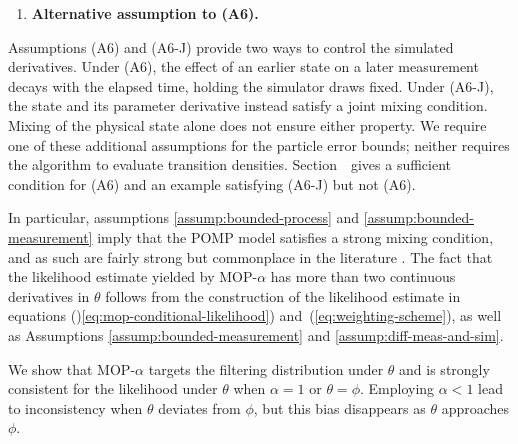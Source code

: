 \documentclass[numsec,webpdf,modern,medium,namedate]{oup-authoring-template}
\begin{document}
\begin{enumerate}[label=(A\arabic*),itemsep=0pt]
\item[(A6-J)]{\textbf{Alternative assumption to (A6).}} 
\end{enumerate}

Assumptions (A6) and (A6-J) provide two ways to control the simulated derivatives.
Under (A6), the effect of an earlier state on a later measurement decays with the elapsed time, holding the simulator draws fixed.
Under (A6-J), the state and its parameter derivative instead satisfy a joint mixing condition.
Mixing of the physical state alone does not ensure either property.
We require one of these additional assumptions for the particle error bounds; neither requires the algorithm to evaluate transition densities.
Section~\suppSecProofSharperBiasVar\ gives a sufficient condition for (A6) and an example satisfying (A6-J) but not (A6).

In particular, assumptions \ref{assump:bounded-process} and \ref{assump:bounded-measurement} imply that the POMP model satisfies a strong mixing condition, and as such are fairly strong but commonplace in the literature \citep{karjalainen23, delMoral04}. The fact that the likelihood estimate yielded by MOP-$\alpha$ has more than two continuous derivatives in $\theta$ follows from the construction of the likelihood estimate in equations ()\ref{eq:mop-conditional-likelihood}) and~(\ref{eq:weighting-scheme}), as well as Assumptions \ref{assump:bounded-measurement} and \ref{assump:diff-meas-and-sim}. 

We show that MOP-$\alpha$ targets the filtering distribution under $\theta$ and is strongly consistent for the likelihood under $\theta$ when $\alpha=1$ or $\theta=\phi$.
Employing $\alpha<1$ lead to inconsistency when $\theta$ deviates from $\phi$, but this bias disappears as $\theta$ approaches $\phi$.
\end{document}
